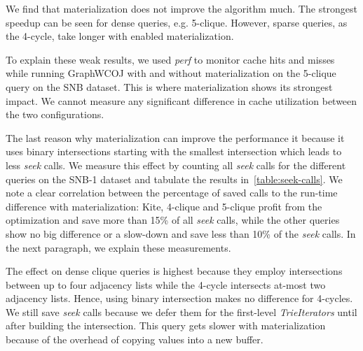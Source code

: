 We find that materialization does not improve the algorithm much.
The strongest speedup can be seen for dense queries, e.g. 5-clique.
However, sparse queries, as the 4-cycle, take longer with enabled materialization.

To explain these weak results, we used \textit{perf} to monitor cache hits and misses while running
GraphWCOJ with and without materialization on the 5-clique query on the SNB dataset.
This is where materialization shows its strongest impact.
We cannot measure any significant difference in cache utilization between the two configurations.

The last reason why materialization can improve the performance it because it uses binary
intersections starting with the smallest intersection which leads to less \textit{seek} calls.
We measure this effect by counting all \textit{seek} calls for the different queries on the
SNB-1 dataset and tabulate the results in~\cref{table:seek-calls}.
We note a clear correlation between the percentage of saved calls to the run-time difference with materialization:
Kite, 4-clique and 5-clique profit from the optimization and save more than 15\% of all \textit{seek} calls, while
the other queries show no big difference or a slow-down and save less than 10\% of the \textit{seek} calls.
In the next paragraph, we explain these measurements.

The effect on dense clique queries is highest because they employ intersections between up to
four adjacency lists while the 4-cycle intersects at-most two adjacency lists.
Hence, using binary intersection makes no difference for 4-cycles.
We still save \textit{seek} calls because we defer them for the first-level \textit{TrieIterators} until after building
the intersection.
This query gets slower with materialization because of the overhead of copying values into a new buffer.

